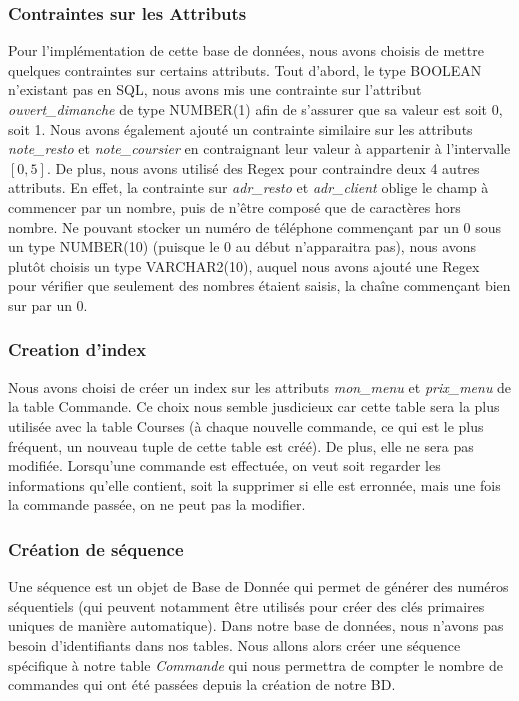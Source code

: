 \documentclass[french]{article}
\begin{document}
        \subsubsection*{Contraintes sur les Attributs}
            Pour l'implémentation de cette base de données, nous avons choisis de mettre quelques contraintes sur certains attributs. Tout d'abord, le type BOOLEAN n'existant pas en SQL, nous avons mis une contrainte sur l'attribut \textit{ouvert\_dimanche} de type NUMBER(1) afin de s'assurer que sa valeur est soit 0, soit 1. Nous avons également ajouté un contrainte similaire sur les attributs \textit{note\_resto} et \textit{note\_coursier} en contraignant leur valeur à appartenir à l'intervalle $[0,5]$. De plus, nous avons utilisé des Regex pour contraindre deux 4 autres attributs. En effet, la contrainte sur \textit{adr\_resto} et \textit{adr\_client} oblige le champ à commencer par un nombre, puis de n'être composé que de caractères hors nombre. Ne pouvant stocker un numéro de téléphone commençant par un 0 sous un type NUMBER(10) (puisque le 0 au début n'apparaitra pas), nous avons plutôt choisis un type VARCHAR2(10), auquel nous avons ajouté une Regex pour vérifier que seulement des nombres étaient saisis, la chaîne commençant bien sur par un 0.

        \subsubsection*{Creation d'index}
            Nous avons choisi de créer un index sur les attributs \textit{mon\_menu} et \textit{prix\_menu} de la table Commande. Ce choix nous semble jusdicieux car cette table sera la plus utilisée avec la table Courses (à chaque nouvelle commande, ce qui est le plus fréquent, un nouveau tuple de cette table est créé). De plus, elle ne sera pas modifiée. Lorsqu'une commande est effectuée, on veut soit regarder les informations qu'elle contient, soit la supprimer si elle est erronnée, mais une fois la commande passée, on ne peut pas la modifier. 
            
        \subsubsection*{Création de séquence}
            Une séquence est un objet de Base de Donnée qui permet de générer des numéros séquentiels (qui peuvent notamment être utilisés pour créer des clés primaires uniques de manière automatique). Dans notre base de données, nous n'avons pas besoin d'identifiants dans nos tables. Nous allons alors créer une séquence spécifique à notre table \textit{Commande} qui nous permettra de compter le nombre de commandes qui ont été passées depuis la création de notre BD.
\end{document}
